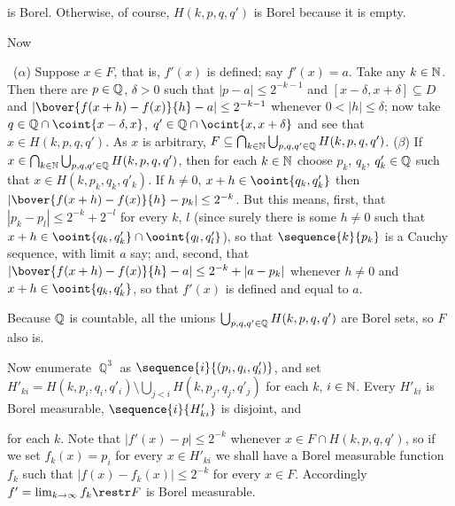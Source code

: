{\noindent is Borel.   Otherwise, of course, $H(k,p,q,q')$ is Borel because
it is empty.\ \Qed

\medskip

 Now


\noindent \Prf\ ($\alpha$) Suppose $x\in F$, that is, $f'(x)$ is
defined;  say $f'(x)=a$.   Take any $k\in\Bbb N$.   Then there are
$p\in\Bbb Q$, $\delta>0$ such that
$|p-a|\le 2^{-k-1}$ and $[x-\delta,x+\delta]\subseteq D$ and
$|\bover{f(x+h)-f(x)}{h}-a|\le 2^{-k-1}$ whenever $0<|h|\le\delta$;
now take
$q\in\Bbb Q\cap\coint{x-\delta,x}$, $q'\in\Bbb Q\cap\ocint{x,x+\delta}$
and see that $x\in H(k,p,q,q')$.   As $x$ is arbitrary,
$F\subseteq\bigcap_{k\in\Bbb N}\bigcup_{p,q,q'\in\Bbb Q}H(k,p,q,q')$.
($\beta$) If
$x\in\bigcap_{k\in\Bbb N}\bigcup_{p,q,q'\in\Bbb Q}H(k,p,q,q')$, then for
each $k\in\Bbb N$ choose $p_k$, $q_k$,
$q'_k\in\Bbb Q$ such that $x\in H(k,p_k,q_k,q'_k)$.   If $h\ne 0$,
$x+h\in\ooint{q_k,q'_k}$ then $|\bover{f(x+h)-f(x)}{h}-p_k|\le 2^{-k}$.
But this means, first, that $|p_k-p_l|\le 2^{-k}+2^{-l}$ for every $k$,
$l$ (since surely there is some $h\ne 0$ such that
$x+h\in\ooint{q_k,q'_k}\cap\ooint{q_l,q'_l}$), so that
$\sequence{k}{p_k}$ is a Cauchy sequence, with limit $a$ say;  and,
second, that $|\bover{f(x+h)-f(x)}{h}-a|\le 2^{-k}+|a-p_k|$ whenever
$h\ne 0$ and $x+h\in\ooint{q_k,q'_k}$, so that $f'(x)$ is defined and
equal to $a$.\ \Qed

\medskip

 Because $\Bbb Q$ is countable, all the unions
$\bigcup_{p,q,q'\in\Bbb Q}H(k,p,q,q')$ are Borel sets, so $F$ also is.

\medskip

 Now enumerate $\BbbQ^3$ as
$\sequence{i}{(p_i,q_i,q'_i)}$, and set
$H'_{ki}=H(k,p_i,q_i,q'_i)\setminus\bigcup_{j<i}H(k,p_j,q_j,q'_j)$ for
each $k$, $i\in\Bbb N$.   Every $H'_{ki}$ is Borel measurable,
$\sequence{i}{H'_{ki}}$ is disjoint, and


\noindent for each $k$.   Note that
$|f'(x)-p|\le 2^{-k}$ whenever $x\in F\cap H(k,p,q,q')$, so if we set
$f_k(x)=p_i$ for every $x\in H'_{ki}$ we shall have a Borel
measurable function
$f_k$ such that $|f(x)-f_k(x)|\le 2^{-k}$ for every $x\in F$.
Accordingly $f'=\lim_{k\to\infty}f_k\restr F$ is Borel measurable.
}%

